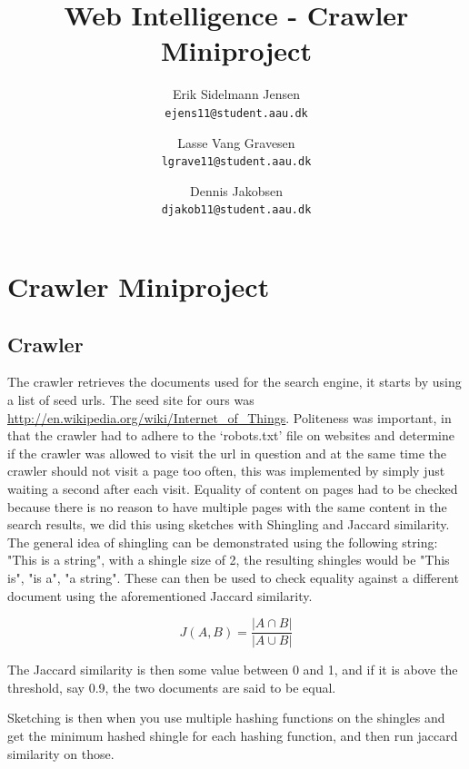 

\author{
  Erik Sidelmann Jensen\\
  \texttt{ejens11@student.aau.dk}
  \and
  Lasse Vang Gravesen\\
  \texttt{lgrave11@student.aau.dk}
  \and
  Dennis Jakobsen\\
  \texttt{djakob11@student.aau.dk}  
}

\title{Web Intelligence - Crawler Miniproject}
\date{}


	\clearpage\maketitle
	\thispagestyle{empty}
	
	\chapter{Crawler Miniproject}
	\section{Crawler}
	The crawler retrieves the documents used for the search engine, it starts by using a list of seed urls.
	The seed site for ours was \url{http://en.wikipedia.org/wiki/Internet_of_Things}.
	Politeness was important, in that the crawler had to adhere to the `robots.txt' file on websites and determine if the crawler was allowed to visit the url in question and at the same time the crawler should not visit a page too often, this was implemented by simply just waiting a second after each visit. 
	Equality of content on pages had to be checked because there is no reason to have multiple pages with the same content in the search results, we did this using sketches with Shingling and Jaccard similarity. The general idea of shingling can be demonstrated using the following string: "This is a string", with a shingle size of 2, the resulting shingles would be "This is", "is a", "a string". These can then be used to check equality against a different document using the aforementioned Jaccard similarity. 
	
	$$ J(A,B) = \frac{| A \cap B |}{|A \cup B|} $$
	
	The Jaccard similarity is then some value between 0 and 1, and if it is above the threshold, say 0.9, the two documents are said to be equal.
	
	Sketching is then when you use multiple hashing functions on the shingles and get the minimum hashed shingle for each hashing function, and then run jaccard similarity on those.
	
